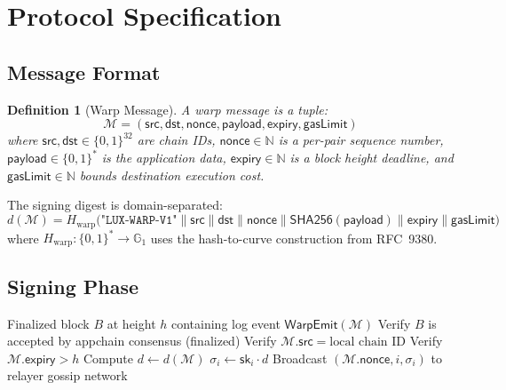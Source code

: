 \documentclass[11pt,a4paper]{article}
\newtheorem{definition}{Definition}
\begin{document}
\section{Protocol Specification}\label{sec:protocol}

\subsection{Message Format}

\begin{definition}[Warp Message]
A warp message is a tuple:
\begin{equation}
    \mathcal{M} = (\mathsf{src}, \mathsf{dst}, \mathsf{nonce}, \mathsf{payload}, \mathsf{expiry}, \mathsf{gasLimit})
\end{equation}
where $\mathsf{src}, \mathsf{dst} \in \{0,1\}^{32}$ are chain IDs, $\mathsf{nonce} \in \mathbb{N}$ is a per-pair sequence number, $\mathsf{payload} \in \{0,1\}^*$ is the application data, $\mathsf{expiry} \in \mathbb{N}$ is a block height deadline, and $\mathsf{gasLimit} \in \mathbb{N}$ bounds destination execution cost.
\end{definition}

The signing digest is domain-separated:
\begin{equation}
    d(\mathcal{M}) = H_{\text{warp}}\bigl(\texttt{"LUX-WARP-V1"} \| \mathsf{src} \| \mathsf{dst} \| \mathsf{nonce} \| \mathsf{SHA256}(\mathsf{payload}) \| \mathsf{expiry} \| \mathsf{gasLimit}\bigr)
\end{equation}
where $H_{\text{warp}} : \{0,1\}^* \to \mathbb{G}_1$ uses the hash-to-curve construction from RFC~9380.

\subsection{Signing Phase}

\begin{algorithm}[H]
\caption{Warp Message Signing (Validator $v_i$)}
\label{alg:signing}
\begin{algorithmic}[1]
\Require Finalized block $B$ at height $h$ containing log event $\mathsf{WarpEmit}(\mathcal{M})$
\State Verify $B$ is accepted by appchain consensus (finalized)
\State Verify $\mathcal{M}.\mathsf{src} = \text{local chain ID}$
\State Verify $\mathcal{M}.\mathsf{expiry} > h$
\State Compute $d \gets d(\mathcal{M})$
\State $\sigma_i \gets \mathsf{sk}_i \cdot d$ 
\State Broadcast $(\mathcal{M}.\mathsf{nonce}, i, \sigma_i)$ to relayer gossip network
\end{algorithmic}
\end{algorithm}
\end{document}
